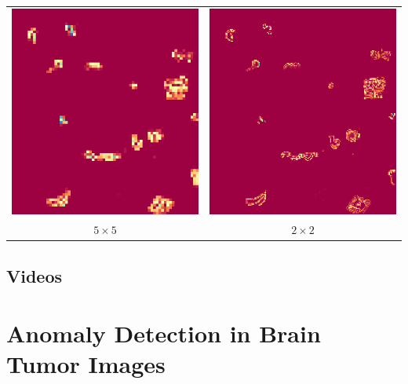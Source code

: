 \begin{center}
\begin{tabular}{c c}
		\includegraphics[scale=0.5]{spot_5_5.png} & \includegraphics[scale=0.5]{spot_2_2.png} \\
		$5 \times 5$  & $2 \times 2$ \\
	\end{tabular}
\end{center}


\subsection{Videos}

\section{Anomaly Detection in Brain Tumor Images}

